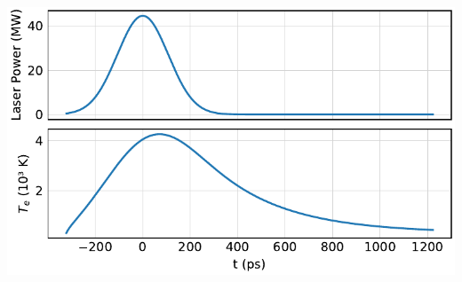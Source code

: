 



\begin{frame}
	\centering
	\includegraphics{../model/figures/temperature profile.pdf}
\end{frame}

